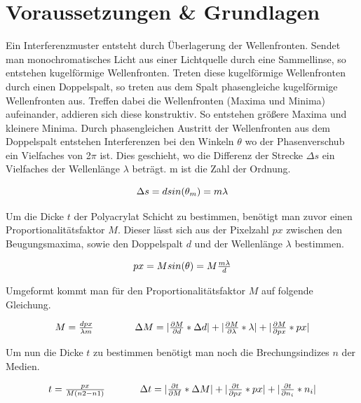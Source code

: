\documentclass[12pt,a4paper,twoside]{article}
\begin{document}
\section{Voraussetzungen \& Grundlagen} %
Ein Interferenzmuster entsteht durch Überlagerung der Wellenfronten. Sendet man monochromatisches Licht aus einer Lichtquelle durch eine Sammellinse, so entstehen kugelförmige Wellenfronten. 
Treten diese kugelförmige Wellenfronten durch einen Doppelspalt, so treten aus dem Spalt phasengleiche kugelförmige Wellenfronten aus. 
Treffen dabei die Wellenfronten (Maxima und Minima) aufeinander, addieren sich diese konstruktiv. So entstehen größere Maxima und kleinere Minima. 
Durch phasengleichen Austritt der Wellenfronten aus dem Doppelspalt entstehen Interferenzen bei den Winkeln $\theta$ wo der Phasenverschub ein Vielfaches von 2$\pi$ ist. 
Dies geschieht, wo die Differenz der Strecke $\Delta s$ ein Vielfaches der Wellenlänge $\lambda$ beträgt. m ist die Zahl der Ordnung. 

\begin{equation}
    \label{eq:beugung am doppelspalt}
    \centerline{$\Delta s = dsin(\theta_m) = m\lambda$}
\end{equation}

\noindent
Um die Dicke $t$ der Polyacrylat Schicht zu bestimmen, benötigt man zuvor einen Proportionalitätsfaktor $M$. Dieser lässt sich aus der Pixelzahl $px$ zwischen den Beugungsmaxima, sowie den Doppelspalt $d$ und der Wellenlänge $\lambda$ bestimmen. 

\begin{equation}
    \label{eq:grundlagen 2}
    \centerline{$px = M sin(\theta) = M \frac{m \lambda}{d}$}
\end{equation}

\noindent
Umgeformt kommt man für den Proportionalitätsfaktor $M$ auf folgende Gleichung. 

\begin{equation}
    \label{eq:Proportionalitätsfaktor}
    \centerline{$M = \frac{d px}{\lambda m}$ \\ $\Delta M = \vert \frac{\partial M}{\partial d} * \Delta d \vert + \vert \frac{\partial M}{\partial \lambda} * \lambda \vert + \vert \frac{\partial M}{\partial px} * px \vert$}
\end{equation}

\noindent
Um nun die Dicke $t$ zu bestimmen benötigt man noch die Brechungsindizes $n$ der Medien. 

\begin{equation}
    \label{eq:Schichtdicke}
    \centerline{$t = \frac{px}{M (n2-n1)} $ \\ $\Delta t = \vert \frac{\partial t}{\partial M} * \Delta M \vert + \vert \frac{\partial t}{\partial px} * px \vert + \vert \frac{\partial t}{\partial n_i} * n_i \vert$}
\end{equation}
\end{document}
